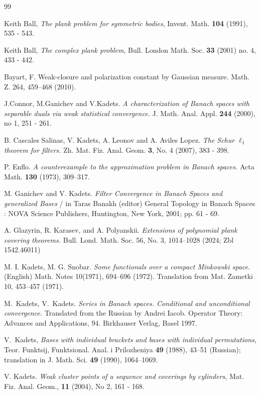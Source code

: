 \documentclass[11pt,twoside, reqno]{amsart}
\theoremstyle{plain}
\theoremstyle{remark}
\theoremstyle{definition}
\numberwithin{equation}{section}
\begin{document}
\begin{thebibliography}{99}

 Keith Ball, {\it The plank problem for symmetric bodies},
Invent. Math. {\bf 104} (1991), 535 - 543.

 Keith Ball, {\it The complex plank problem},
Bull. London Math. Soc. {\bf 33} (2001) no. 4, 433 - 442.

 Bayart, F. Weak-closure and polarization constant by Gaussian measure. Math. Z. 264, 459--468 (2010). 

 J.Connor, M.Ganichev and V.Kadets. \textit{A
characterization of Banach spaces with separable duals via weak statistical
convergence.} J. Math. Anal. Appl. \textbf{244} (2000), no 1, 251 - 261.

 B. Cascales Salinas, V. Kadets, A. Leonov and A. Aviles
Lopez. \textit{The Schur $\ell_1$ theorem for filters.} Zh. Mat. Fiz. Anal.
Geom. \textbf{3}, No. 4 (2007), 383 - 398.

 P. Enflo. \textit{A counterexample to the approximation problem in Banach spaces.} Acta Math. \textbf{130} (1973), 309--317.

 M. Ganichev and V. Kadets. \textit{Filter Convergence in
Banach Spaces and generalized Bases } / in Taras Banakh (editor) General
Topology in Banach Spaces : NOVA Science Publishers, Huntington, New York,
2001; pp. 61 - 69.

 A. Glazyrin, R. Karasev, and A.  Polyanskii. \textit{Extensions of polynomial plank covering theorems.} Bull. Lond. Math. Soc. 56, No. 3, 1014--1028 (2024; Zbl 1542.46011)

  M. I. Kadets, M. G. Snobar. 
\textit{Some functionals over a compact Minkowski space}. (English) 
Math. Notes 10(1971), 694--696 (1972).
Translation from Mat. Zametki 10, 453--457 (1971).

 M.~Kadets, V.~Kadets.
{\it Series in Banach spaces. Conditional and unconditional convergence.}
Translated from the Russian by Andrei Iacob.
Operator Theory: Advances and Applications, 94. Birkhauser Verlag,
Basel 1997.

 V.~Kadets, \textit{Bases with individual brackets and bases with individual permutations}, Teor. Funktsij, Funktsional. Anal. i Prilozheniya \textbf{49} (1988), 43--51 (Russian); translation in J. Math. Sci. \textbf{49} (1990), 1064--1069.

 V. Kadets. \textit{Weak cluster points of a sequence and
coverings by cylinders}, Mat. Fiz. Anal. Geom., \textbf{11} (2004), No 2,
161 - 168.


\end{thebibliography}
\end{document}
